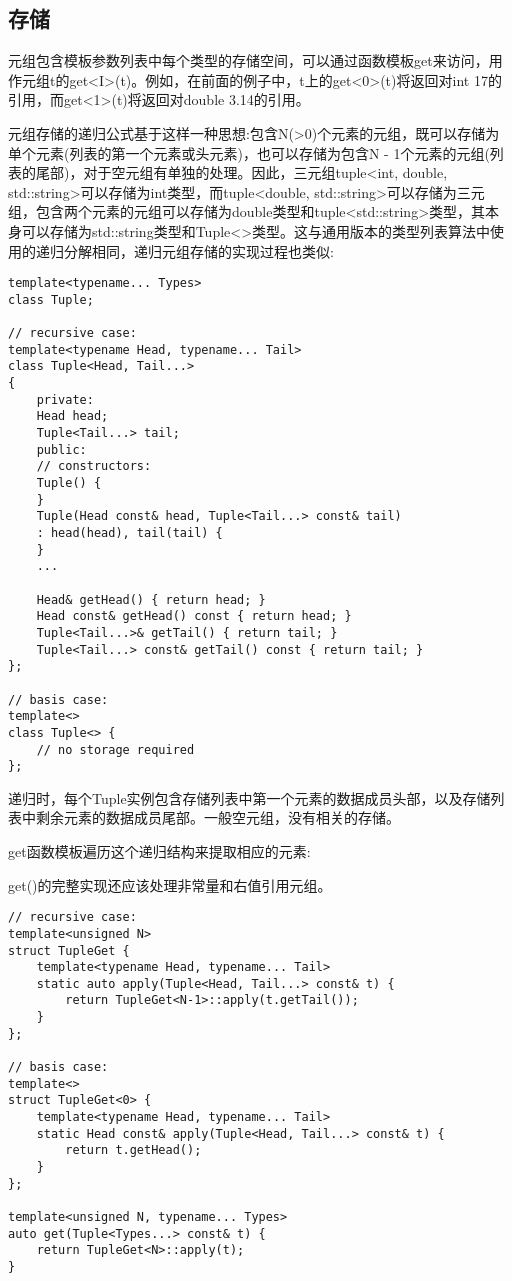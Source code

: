 


\subsection{存储}

元组包含模板参数列表中每个类型的存储空间，可以通过函数模板get来访问，用作元组t的get<I>(t)。例如，在前面的例子中，t上的get<0>(t)将返回对int 17的引用，而get<1>(t)将返回对double 3.14的引用。

元组存储的递归公式基于这样一种思想:包含N(>0)个元素的元组，既可以存储为单个元素(列表的第一个元素或头元素)，也可以存储为包含N - 1个元素的元组(列表的尾部)，对于空元组有单独的处理。因此，三元组tuple<int, double, std::string>可以存储为int类型，而tuple<double, std::string>可以存储为三元组，包含两个元素的元组可以存储为double类型和tuple<std::string>类型，其本身可以存储为std::string类型和Tuple<>类型。这与通用版本的类型列表算法中使用的递归分解相同，递归元组存储的实现过程也类似:

\begin{lstlisting}[style=styleCXX]
template<typename... Types>
class Tuple;

// recursive case:
template<typename Head, typename... Tail>
class Tuple<Head, Tail...>
{
	private:
	Head head;
	Tuple<Tail...> tail;
	public:
	// constructors:
	Tuple() {
	}
	Tuple(Head const& head, Tuple<Tail...> const& tail)
	: head(head), tail(tail) {
	}
	...
	
	Head& getHead() { return head; }
	Head const& getHead() const { return head; }
	Tuple<Tail...>& getTail() { return tail; }
	Tuple<Tail...> const& getTail() const { return tail; }
};

// basis case:
template<>
class Tuple<> {
	// no storage required
};
\end{lstlisting}

递归时，每个Tuple实例包含存储列表中第一个元素的数据成员头部，以及存储列表中剩余元素的数据成员尾部。一般空元组，没有相关的存储。

get函数模板遍历这个递归结构来提取相应的元素:

\begin{tcolorbox}[colback=webgreen!5!white,colframe=webgreen!75!black]
\hspace*{0.75cm}get()的完整实现还应该处理非常量和右值引用元组。
\end{tcolorbox}

\begin{lstlisting}[style=styleCXX]
// recursive case:
template<unsigned N>
struct TupleGet {
	template<typename Head, typename... Tail>
	static auto apply(Tuple<Head, Tail...> const& t) {
		return TupleGet<N-1>::apply(t.getTail());
	}
};

// basis case:
template<>
struct TupleGet<0> {
	template<typename Head, typename... Tail>
	static Head const& apply(Tuple<Head, Tail...> const& t) {
		return t.getHead();
	}
};

template<unsigned N, typename... Types>
auto get(Tuple<Types...> const& t) {
	return TupleGet<N>::apply(t);
}
\end{lstlisting}


